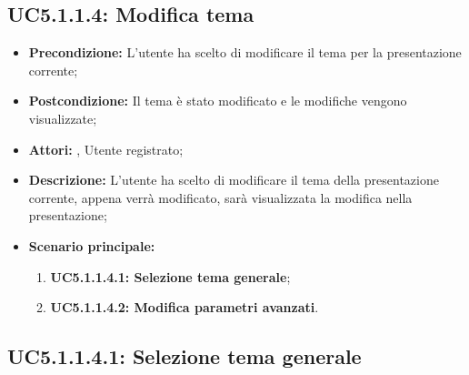 \subsection{ UC5.1.1.4: Modifica tema}

\begin{itemize}
	\item \textbf{Precondizione:} L’utente ha scelto di modificare il tema per la presentazione corrente;
	\item \textbf{Postcondizione:} Il tema è stato modificato e le modifiche vengono visualizzate;
	\item \textbf{Attori:} , Utente registrato;
	\item \textbf{Descrizione:} L'utente ha scelto di modificare il tema della presentazione corrente, appena verrà modificato, sarà visualizzata la modifica nella presentazione;
	\item \textbf{Scenario principale:}
	\begin{enumerate}
		\item \textbf{ UC5.1.1.4.1: Selezione tema generale};
		\item \textbf{ UC5.1.1.4.2: Modifica parametri avanzati}.
	\end{enumerate}
\end{itemize}
\subsection{ UC5.1.1.4.1: Selezione tema generale}

